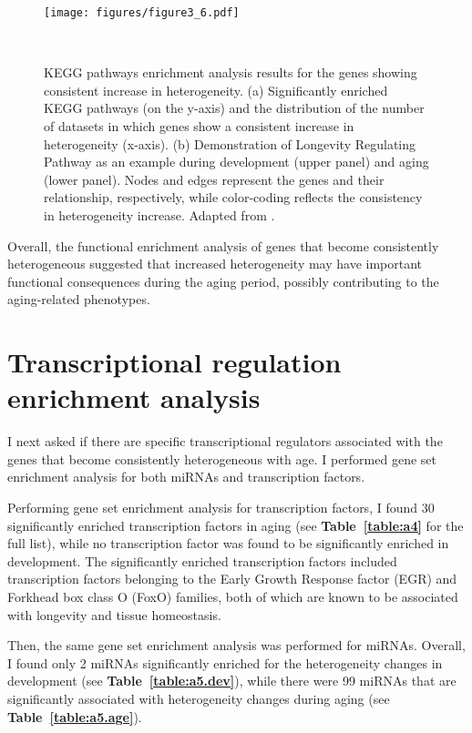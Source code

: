 \begin{figure}[!ht]
    \centering
    \texttt{[image: figures/figure3\_6.pdf]}
    \caption{KEGG pathways enrichment analysis results for the genes showing consistent increase in heterogeneity.
    (a) Significantly enriched KEGG pathways (on the y-axis) and the distribution of the number of datasets in which genes show a consistent increase in heterogeneity (x-axis). 
    (b) Demonstration of Longevity Regulating Pathway as an example during development (upper panel) and aging (lower panel). 
    Nodes and edges represent the genes and their relationship, respectively, while color-coding reflects the consistency in heterogeneity increase.
    Adapted from \autocite{Isildak2020}.
    }~\label{fig:fig3.6}
\end{figure}

Overall, the functional enrichment analysis of genes that become consistently heterogeneous suggested that 
increased heterogeneity may have important functional consequences during the aging period, possibly contributing to the aging-related phenotypes.

\section{Transcriptional regulation enrichment analysis}
I next asked if there are specific transcriptional regulators associated with the genes that become consistently heterogeneous with age.
I performed gene set enrichment analysis for both miRNAs and transcription factors.

Performing gene set enrichment analysis for transcription factors, 
I found 30 significantly enriched transcription factors in aging (see \textbf{Table~\ref{table:a4}} for the full list),
while no transcription factor was found to be significantly enriched in development. 
The significantly enriched transcription factors included transcription factors belonging to the Early Growth Response factor (EGR) and Forkhead box class O (FoxO) families,
both of which are known to be associated with longevity and tissue homeostasis. 

Then, the same gene set enrichment analysis was performed for miRNAs. 
Overall, I found only 2 miRNAs significantly enriched for the heterogeneity changes in development (see \textbf{Table~\ref{table:a5.dev}}), 
while there were 99 miRNAs that are significantly associated with heterogeneity changes during aging (see \textbf{Table~\ref{table:a5.age}}).

